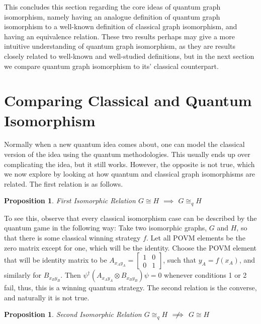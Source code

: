 \documentclass[12pt]{article}
\newtheorem{proposition}[thm]{Proposition}
\begin{document}
This concludes this section regarding the core ideas of quantum graph
isomorphism, namely having an analogue definition of quantum graph
isomorphism to a well-known definition of classical graph isomorphism,
and having an equivalence relation. These two results perhaps may give
a more intuitive understanding of quantum graph isomorphism, as they
are results closely related to well-known and well-studied
definitions, but in the next section we compare quantum graph
isomorphism to its' classical counterpart.

\section{Comparing Classical and Quantum Isomorphism}
\label{sec:compare}

Normally when a new quantum idea comes about, one can model the
classical version of the idea using the quantum methodologies. This
usually ends up over complicating the idea, but it still
works. However, the opposite is not true, which we now explore by
looking at how quantum and classical graph isomorphisms are
related. The first relation is as follows.

\begin{proposition}{First Isomorphic Relation}
  \label{prop:isoimpliesqiso}
  $G \cong H$ $\implies$ $G \cong_q H$
\end{proposition}

To see this, observe that every classical isomorphism case can be
described by the quantum game in the following way: Take two
isomorphic graphs, $G$ and $H$, so that there is some classical
winning strategy $f$. Let all POVM elements be the zero matrix except
for one, which will be the identity. Choose the POVM element that will
be identity matrix to be $A_{x_Ay_A} =
\begin{bmatrix}
1 & 0 \\
0 & 1
\end{bmatrix}$, such that $y_A = f(x_A)$, and similarly for
$B_{x_By_B}$. Then $\psi^\dag(A_{x_Ay_A} \otimes B_{x_By_B})\psi = 0$
whenever conditions 1 or 2 fail, thus, this is a winning quantum
strategy.  The second relation is the converse, and naturally it is
not true.

\begin{proposition}{Second Isomorphic Relation}
  $G \cong_q H$ $\centernot\implies$ $G \cong H$
\end{proposition}
\end{document}
